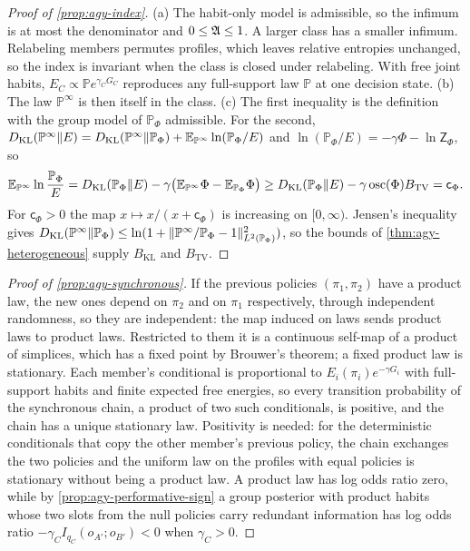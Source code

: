 \begin{proof}[Proof of \cref{prop:agy-index}]
(a) The habit-only model is admissible, so the infimum is at most the denominator and $0\le\mathfrak{A}\le1$. A larger class has a smaller infimum. Relabeling members permutes profiles, which leaves relative entropies unchanged, so the index is invariant when the class is closed under relabeling. With free joint habits, $E_C\propto\mathbb Pe^{\gamma_CG_C}$ reproduces any full-support law $\mathbb P$ at one decision state. (b) The law $\mathbb P^\infty$ is then itself in the class. (c) The first inequality is the definition with the group model of $\mathbb P_\Phi$ admissible. For the second, $D_{\mathrm{KL}}(\mathbb P^\infty\Vert E)=D_{\mathrm{KL}}(\mathbb P^\infty\Vert\mathbb P_\Phi)+\mathbb{E}_{\mathbb P^\infty}\ln(\mathbb P_\Phi/E)$ and $\ln(\mathbb P_\Phi/E)=-\gamma\Phi-\ln\mathsf Z_\Phi$, so
\begin{equation*}
\mathbb{E}_{\mathbb P^\infty}\ln\frac{\mathbb P_\Phi}E=D_{\mathrm{KL}}(\mathbb P_\Phi\Vert E)-\gamma\bigl(\mathbb{E}_{\mathbb P^\infty}\Phi-\mathbb{E}_{\mathbb P_\Phi}\Phi\bigr)\ge D_{\mathrm{KL}}(\mathbb P_\Phi\Vert E)-\gamma\operatorname{osc}(\Phi)B_{\mathrm{TV}}=\mathsf c_\Phi.
\end{equation*}
For $\mathsf c_\Phi>0$ the map $x\mapsto x/(x+\mathsf c_\Phi)$ is increasing on $[0,\infty)$. Jensen's inequality gives $D_{\mathrm{KL}}(\mathbb P^\infty\Vert\mathbb P_\Phi)\le\ln(1+\Vert\mathbb P^\infty/\mathbb P_\Phi-1\Vert^2_{L^2(\mathbb P_\Phi)})$, so the bounds of \cref{thm:agy-heterogeneous} supply $B_{\mathrm{KL}}$ and $B_{\mathrm{TV}}$.
\end{proof}

\begin{proof}[Proof of \cref{prop:agy-synchronous}]
If the previous policies $(\pi_1,\pi_2)$ have a product law, the new ones depend on $\pi_2$ and on $\pi_1$ respectively, through independent randomness, so they are independent: the map induced on laws sends product laws to product laws. Restricted to them it is a continuous self-map of a product of simplices, which has a fixed point by Brouwer's theorem; a fixed product law is stationary. Each member's conditional is proportional to $E_i(\pi_i)e^{-\gamma G_i}$ with full-support habits and finite expected free energies, so every transition probability of the synchronous chain, a product of two such conditionals, is positive, and the chain has a unique stationary law. Positivity is needed: for the deterministic conditionals that copy the other member's previous policy, the chain exchanges the two policies and the uniform law on the profiles with equal policies is stationary without being a product law. A product law has log odds ratio zero, while by \cref{prop:agy-performative-sign} a group posterior with product habits whose two slots from the null policies carry redundant information has log odds ratio $-\gamma_CI_{q_C}(o_{A'};o_{B'})<0$ when $\gamma_C>0$.
\end{proof}


